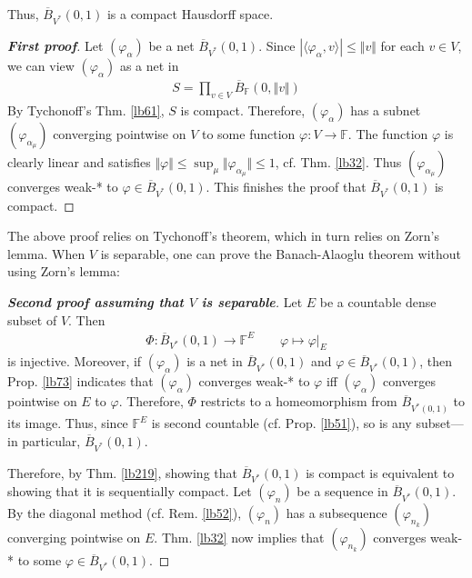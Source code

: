 \documentclass[12pt,b5paper,notitlepage]{article}
\theoremstyle{definition}
\theoremstyle{plain}
\newcommand{\ovl}{\overline}
\newcommand{\bk}[1]{\langle {#1}\rangle}
\newcommand{\Fbb}{\mathbb F}
\numberwithin{equation}{section}
\begin{document}
Thus, $\ovl B_{V^*}(0,1)$ is a compact Hausdorff space.


\begin{proof}[\textbf{First proof}]
Let $(\varphi_\alpha)$ be a net $\ovl B_{V^*}(0,1)$. Since $|\bk{\varphi_\alpha,v}|\leq\Vert v\Vert$ for each $v\in V$, we can view $(\varphi_\alpha)$ as a net in
\begin{align*}
S=\prod_{v\in V} \ovl B_\Fbb(0,\Vert v\Vert)
\end{align*}
By Tychonoff's Thm. \ref{lb61}, $S$ is compact. Therefore, $(\varphi_\alpha)$ has a subnet $(\varphi_{\alpha_\mu})$ converging pointwise on $V$ to some function $\varphi:V\rightarrow\Fbb$. The function $\varphi$ is clearly linear and satisfies $\Vert\varphi\Vert\leq\sup_\mu\Vert\varphi_{\alpha_\mu}\Vert\leq 1$, cf. Thm. \ref{lb32}.  Thus $(\varphi_{\alpha_\mu})$ converges weak-* to $\varphi\in\ovl B_{V^*}(0,1)$. This finishes the proof that $\ovl B_{V^*}(0,1)$ is compact.
\end{proof}

The above proof relies on Tychonoff's theorem, which in turn relies on Zorn's lemma. When $V$ is separable, one can prove the Banach-Alaoglu theorem without using Zorn's lemma:

\begin{proof}[\textbf{Second proof assuming that $V$ is separable}]
Let $E$ be a countable dense subset of $V$. Then
\begin{align*}
\Phi:\ovl B_{V^*}(0,1)\rightarrow\Fbb^E\qquad\varphi\mapsto\varphi|_E
\end{align*}
is injective. Moreover, if $(\varphi_\alpha)$ is a net in $\ovl B_{V^*}(0,1)$ and $\varphi\in\ovl B_{V^*}(0,1)$, then Prop. \ref{lb73} indicates that $(\varphi_\alpha)$ converges weak-* to $\varphi$ iff $(\varphi_\alpha)$ converges pointwise on $E$ to $\varphi$. Therefore, $\Phi$ restricts to a homeomorphism from $\ovl B_{V^*(0,1)}$ to its image. Thus, since $\Fbb^E$ is second countable (cf. Prop. \ref{lb51}), so is any subset---in particular, $\ovl B_{V^*}(0,1)$. 

Therefore, by Thm. \ref{lb219}, showing that $\ovl B_{V^*}(0,1)$ is compact is equivalent to showing that it is sequentially compact. Let $(\varphi_n)$ be a sequence in $\ovl B_{V^*}(0,1)$. By the diagonal method (cf. Rem. \ref{lb52}), $(\varphi_n)$ has a subsequence $(\varphi_{n_k})$ converging pointwise on $E$. Thm. \ref{lb32} now implies that $(\varphi_{n_k})$ converges weak-* to some $\varphi\in\ovl B_{V^*}(0,1)$.
\end{proof}
\end{document}
